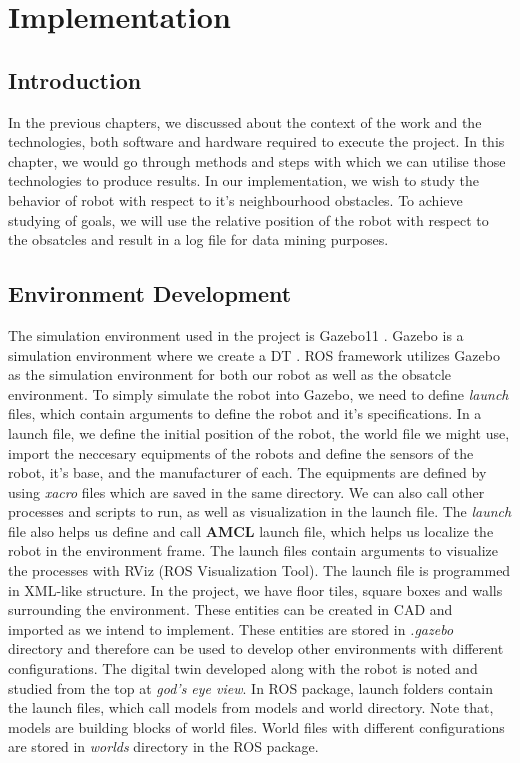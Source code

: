 
\chapter{Implementation} %

\label{Chapter3} %

\section{Introduction}
In the previous chapters, we discussed about the context of the work and the technologies, both software and hardware required to execute the project. In this chapter, we would go through methods and steps 
with which we can utilise those technologies to produce results. In our implementation, we wish to study the behavior of robot with respect to it's neighbourhood obstacles. To achieve studying of goals, we will use the relative position of the robot
with respect to the obsatcles and result in a log file for data mining purposes.

\section{Environment Development}
The simulation environment used in the project is Gazebo11 \cite{1389727}. Gazebo is a simulation environment where we create a DT \cite{8901113}. ROS framework utilizes Gazebo as 
the simulation environment for both our robot as well as the obsatcle environment. To simply simulate the robot into Gazebo, we need to define \textit{launch} files, which contain arguments to define the robot and it's specifications.
In a launch file, we define the initial position of the robot, the world file we might use, import the neccesary equipments of the robots and define the sensors of the robot, it's base, and the manufacturer of each.
The equipments are defined by using \textit{xacro} files which are saved in the same directory. We can also call other processes and scripts to run, as well as visualization in the launch file. The \textit{launch} file also helps us define and call \textbf{AMCL} launch file,
which helps us localize the robot in the environment frame. The launch files contain arguments to visualize the processes with RViz (ROS Visualization Tool). The launch file is programmed in XML-like structure.
In the project, we have floor tiles, square boxes and walls surrounding the environment. These entities can be created in CAD and imported as we intend to implement. These entities are stored in \textit{.gazebo} directory 
and therefore can be used to develop other environments with different configurations. The digital twin developed along with the robot is noted and studied from the top at \textit{god's eye view}.
In ROS package, launch folders contain the launch files, which call models from models and world directory. Note that, models are building blocks of world files. World files with different configurations are stored in \textit{worlds} directory in the ROS package.

